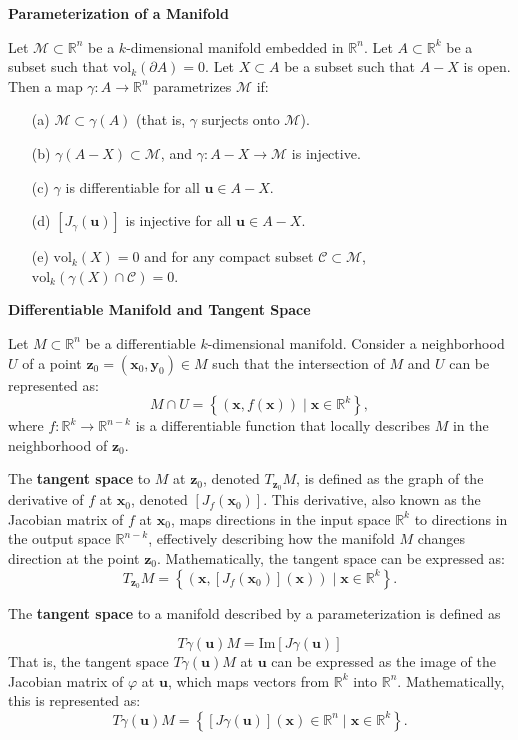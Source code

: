 \documentclass{article}
\newcommand{\R}{\mathbb{R}}
\newenvironment{definition}[1]{
    \par\noindent\textbf{#1}\par\noindent
}{
    \par \vspace{0.5cm}
}
\begin{document}
\begin{definition}{Parameterization of a Manifold}
Let \(\mathcal{M} \subset \R^n\) be a \(k\)-dimensional manifold embedded in \(\R^n\). Let \(A \subset \R^k\) be a subset such that \(\text{vol}_k(\partial A) = 0\). Let \(X \subset A\) be a subset such that \(A - X\) is open. Then a map \(\gamma : A \to \R^n\) parametrizes \(\mathcal{M}\) if:
\begin{enumerate}
    \item[(a)] \(\mathcal{M} \subset \gamma(A)\) (that is, \(\gamma\) surjects onto \(\mathcal{M}\)).
    \item[(b)] \(\gamma(A - X) \subset \mathcal{M}\), and \(\gamma : A - X \to \mathcal{M}\) is injective.
    \item[(c)] \(\gamma\) is differentiable for all \(\bm{u} \in A - X\).
    \item[(d)] \([J_\gamma(\bm{u})]\) is injective for all \(\bm{u} \in A - X\).
    \item[(e)] \(\text{vol}_k(X) = 0\) and for any compact subset \(\mathcal{C} \subset \mathcal{M}\), \(\text{vol}_k(\gamma(X) \cap \mathcal{C}) = 0\).
\end{enumerate}
\end{definition}

\begin{definition}{Differentiable Manifold and Tangent Space}
Let \(M \subset \R^n\) be a differentiable \(k\)-dimensional manifold. Consider a neighborhood \(U\) of a point \(\bm{z}_0 = (\bm{x}_0, \bm{y}_0) \in M\) such that the intersection of \(M\) and \(U\) can be represented as:
\[
M \cap U = \left\{ (\bm{x}, f(\bm{x})) \mid \bm{x} \in \R^k \right\},
\]
where \(f: \R^k \to \R^{n-k}\) is a differentiable function that locally describes \(M\) in the neighborhood of \(\bm{z}_0\).

The \textbf{tangent space} to \(M\) at \(\bm{z}_0\), denoted \(T_{\bm{z}_0}M\), is defined as the graph of the derivative of \(f\) at \(\bm{x}_0\), denoted \([J_f(\bm{x}_0)]\). This derivative, also known as the Jacobian matrix of \(f\) at \(\bm{x}_0\), maps directions in the input space \(\R^k\) to directions in the output space \(\R^{n-k}\), effectively describing how the manifold \(M\) changes direction at the point \(\bm{z}_0\). Mathematically, the tangent space can be expressed as:
\[
T_{\bm{z}_0}M = \left\{ (\bm{x}, [J_f(\bm{x}_0)](\bm{x})) \mid \bm{x} \in \R^k \right\}.
\]

The \textbf{tangent space} to a manifold described by a parameterization is defined as

\[
T\gamma(\bm{u})M = \text{Im}[J\gamma(\bm{u})]
\]
That is, the tangent space \(T\gamma(\bm{u})M\) at \(\bm{u}\) can be expressed as the image of the Jacobian matrix of \(\varphi\) at \(\bm{u}\), which maps vectors from \(\R^k\) into \(\R^n\). Mathematically, this is represented as:
\[
T\gamma(\bm{u})M = \left\{ [J\gamma(\bm{u})](\bm{x}) \in \R^n \mid \bm{x} \in \R^k \right\}.
\]

\end{definition}
\end{document}
